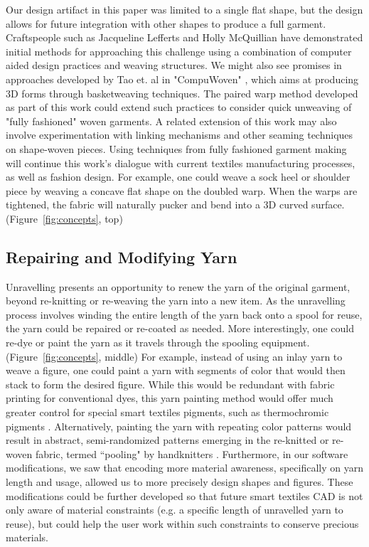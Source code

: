 Our design artifact in this paper was limited to a single flat shape, but the design allows for future integration with other shapes to produce a full garment. Craftspeople such as Jacqueline Lefferts \cite{lefferts_fullfashionedweaving} and Holly McQuillian \cite{mcquillan2019hybrid} have demonstrated initial methods for approaching this challenge using a combination of computer aided design practices and weaving structures. We might also see promises in approaches developed by Tao et. al in "CompuWoven" \cite{tao_compuwoven:_2016}, which aims at producing 3D forms through basketweaving techniques. The paired warp method developed as part of this work could extend such practices to consider quick unweaving of "fully fashioned" woven garments.  A related extension of this work may also involve experimentation with linking mechanisms and other seaming techniques on shape-woven pieces. Using techniques from fully fashioned garment making will continue this work's dialogue with current textiles manufacturing processes, as well as fashion design.  For example, one could weave a sock heel or shoulder piece by weaving a concave flat shape on the doubled warp. When the warps are tightened, the fabric will naturally pucker and bend into a 3D curved surface. (Figure~\ref{fig:concepts}, top)

\subsection{Repairing and Modifying Yarn}

Unravelling presents an opportunity to renew the yarn of the original garment, beyond re-knitting or re-weaving the yarn into a new item. As the unravelling process involves winding the entire length of the yarn back onto a spool for reuse, the yarn could be repaired or re-coated as needed. More interestingly, one could re-dye or paint the yarn as it travels through the spooling equipment. (Figure~\ref{fig:concepts}, middle) For example, instead of using an inlay yarn to weave a figure, one could paint a yarn with segments of color that would then stack to form the desired figure. While this would be redundant with fabric printing for conventional dyes, this yarn painting method would offer much greater control for special smart textiles pigments, such as thermochromic pigments \cite{devendorf_adapting_2019}. Alternatively, painting the yarn with repeating color patterns would result in abstract, semi-randomized patterns emerging in the re-knitted or re-woven fabric, termed ``pooling" by handknitters \cite{plannedpooling}. Furthermore, in our software modifications, we saw that encoding more material awareness, specifically on yarn length and usage, allowed us to more precisely design shapes and figures. These modifications could be further developed so that future smart textiles CAD is not only aware of material constraints (e.g. a specific length of unravelled yarn to reuse), but could help the user work within such constraints to conserve precious materials.


